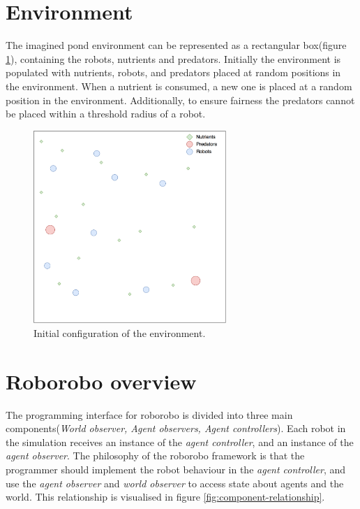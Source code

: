 \section{Environment}
The imagined pond environment can be represented as a rectangular box(figure \ref{fig:environment}), containing the robots, nutrients and predators.
Initially the environment is populated with nutrients, robots, and predators placed at random positions in the environment.
When a nutrient is consumed, a new one is placed at a random position in the environment.
Additionally, to ensure fairness the predators cannot be placed within a threshold radius of a robot. 

\begin{figure}[H]
	
	\centering
	\includegraphics[width=0.65\textwidth]{chapters/res/Environment.png}
	\caption{Initial configuration of the environment.}
	\label{fig:environment}
\end{figure}

\section{Roborobo overview}
The programming interface for roborobo is divided into three main components(\emph{World observer, Agent observers, Agent controllers}).
Each robot in the simulation receives an instance of the \emph{agent controller}, and an instance of the \emph{agent observer}.
The philosophy of the roborobo framework is that the programmer should implement the robot behaviour in the \emph{agent controller}, and use the \emph{agent observer} and \emph{world observer} to access state about agents and the world.
This relationship is visualised in figure \ref{fig:component-relationship}.

